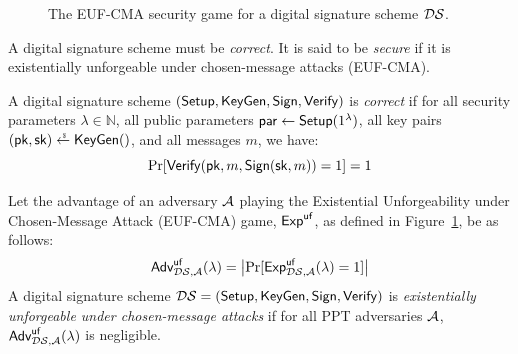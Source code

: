\begin{figure}[t]
	\centering
	\begin{pchstack}[boxed,space=1em]
		\begin{pcvstack}[space=1em]
		\end{pcvstack}
		\begin{pcvstack}[space=1em]
		\end{pcvstack}
	\end{pchstack}
	\caption{The EUF-CMA security game for a digital signature scheme $\mathcal{DS}$.}
	\label{fig:euf-cma}
\end{figure}

\noindent A digital signature scheme must be \emph{correct}.  It is said to be \emph{secure} if it is existentially unforgeable under
chosen-message attacks (EUF-CMA).

\begin{definition}[Correctness]
A digital signature scheme $(\mathsf{Setup}, \mathsf{KeyGen}, \mathsf{Sign}, \allowbreak \mathsf{Verify})$ is \emph{correct}
if for all security parameters $\lambda \in \mathbb{N}$,
all public parameters $\mathsf{par} \leftarrow \mathsf{Setup}(1^\lambda)$,
all key pairs $(\pk, \sk) \rgets \KeyGen()$, and all messages $m$, we have:
\[ \Pr[ \mathsf{Verify}(\mathsf{pk}, m, \mathsf{Sign}(\mathsf{sk}, m)) = 1 ] = 1 \]
\end{definition}

\begin{definition}\label{defn:euf-cma}
Let the advantage of an adversary $\mathcal{A}$ playing the Existential Unforgeability under Chosen-Message Attack (EUF-CMA) game,
  $\textsf{Exp}^{\mathsf{uf}}$, as defined in Figure~\ref{fig:euf-cma}, be as follows:
%
\[
  \textsf{\upshape Adv}^{\textrm{\upshape $\mathsf{uf}$}}_{\mathcal{DS},\mathcal{A}}(\lambda) = \bigl| \Pr[\textsf{Exp}^{\mathsf{uf}}_{\mathcal{DS},\mathcal{A}}(\lambda) = 1] \bigr|
\]
A digital signature scheme $\mathcal{DS} = (\mathsf{Setup}, \mathsf{KeyGen}, \mathsf{Sign}, \allowbreak
  \mathsf{Verify})$ is \emph{existentially unforgeable under chosen-message attacks} if
  for all PPT adversaries $\mathcal{A}$, $\textsf{\upshape Adv}^{\textrm{\upshape $\mathsf{uf}$}}_{\mathcal{DS},\mathcal{A}}(\lambda)$ is negligible.
\end{definition}

